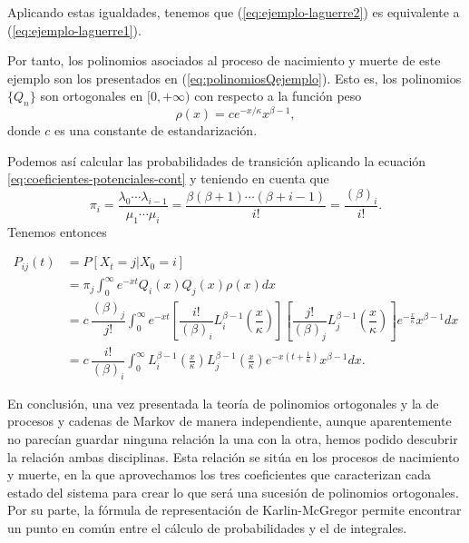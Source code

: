 \begin{ejemplo}
    Aplicando estas igualdades, tenemos que (\ref{eq:ejemplo-laguerre2}) es equivalente a (\ref{eq:ejemplo-laguerre1}).

    Por tanto, los polinomios asociados al proceso de nacimiento y muerte de este ejemplo son los presentados en (\ref{eq:polinomiosQejemplo}). Esto es, los polinomios $\{Q_n\}$ son ortogonales en $[0,+\infty)$ con respecto a la función peso 
    $$
    \rho(x) = ce^{-x/\kappa} x^{\beta-1},
    $$
    donde $c$ es una constante de estandarización.

    Podemos así calcular las probabilidades de transición aplicando la ecuación \eqref{eq:coeficientes-potenciales-cont} y teniendo en cuenta que
    $$
        \pi_i = \dfrac{\lambda_0\cdots \lambda_{i-1}}{\mu_1\cdots \mu_i} = \dfrac{\beta(\beta+1)\cdots (\beta+i-1)}{i!} = \dfrac{(\beta)_i}{i!}.
    $$
    Tenemos entonces

    \begin{equation*}
        \begin{split}
            P_{ij}(t) &= P[X_t = j|X_0=i] \\
            &= \pi_j\int_0^\infty e^{-xt}Q_i(x)Q_j(x)\rho(x)dx \\
            &= c\, \dfrac{(\beta)_j}{j!}\int_0^\infty e^{-xt}\left[\dfrac{i!}{(\beta)_i} L_i^{\beta-1}\left(\dfrac{x}{\kappa}\right)\right]\left[\dfrac{j!}{(\beta)_j} L_j^{\beta-1}\left(\dfrac{x}{\kappa}\right)\right]e^{-\frac x \kappa}x^{\beta-1}dx \\
            &= c\, \dfrac{i!}{(\beta)_i}\int_0^\infty  L_i^{\beta-1}\left(\frac x \kappa\right) L_j^{\beta-1}\left(\frac x \kappa\right) e^{-x(t+\frac 1 \kappa)} x^{\beta-1} dx. 
        \end{split}
    \end{equation*}

\end{ejemplo}

En conclusión, una vez presentada la teoría de polinomios ortogonales y la de procesos y cadenas de Markov de manera independiente, aunque aparentemente no parecían guardar ninguna relación la una con la otra, hemos podido descubrir la relación ambas disciplinas. Esta relación se sitúa en los procesos de nacimiento y muerte, en la que aprovechamos los tres coeficientes que caracterizan cada estado del sistema para crear lo que será una sucesión de polinomios ortogonales. Por su parte, la fórmula de representación de Karlin-McGregor permite encontrar un punto en común entre el cálculo de probabilidades y el de integrales.
